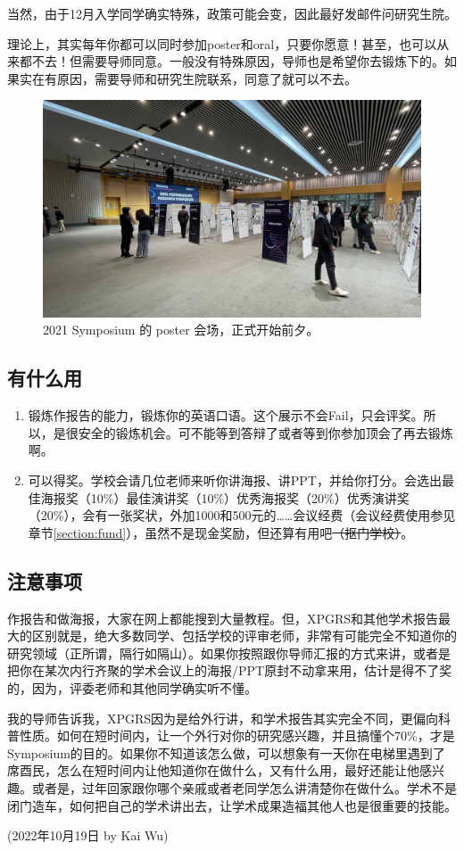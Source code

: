 当然，由于12月入学同学确实特殊，政策可能会变，因此最好发邮件问研究生院。

理论上，其实每年你都可以同时参加poster和oral，只要你愿意！甚至，也可以从来都不去！但需要导师同意。一般没有特殊原因，导师也是希望你去锻炼下的。如果实在有原因，需要导师和研究生院联系，同意了就可以不去。

\begin{figure}[H]
    \caption{2021 Symposium 的 poster 会场，正式开始前夕。}
    \centering
    \includegraphics[width=\columnwidth]{author-folder/Kai.Wu/synposium_poster.jpg}
\end{figure}

\subsection{有什么用}

\begin{enumerate}
    \item 锻炼作报告的能力，锻炼你的英语口语。这个展示不会Fail，只会评奖。所以，是很安全的锻炼机会。可不能等到答辩了或者等到你参加顶会了再去锻炼啊。
    \item 可以得奖。学校会请几位老师来听你讲海报、讲PPT，并给你打分。会选出最佳海报奖（10\%）最佳演讲奖（10\%）优秀海报奖（20\%）优秀演讲奖（20\%），会有一张奖状，外加1000和500元的……会议经费（会议经费使用参见章节\ref{section:fund}），虽然不是现金奖励，但还算有用吧\sout{（抠门学校）}。
\end{enumerate}

\subsection{注意事项}

作报告和做海报，大家在网上都能搜到大量教程。但，XPGRS和其他学术报告最大的区别就是，绝大多数同学、包括学校的评审老师，非常有可能完全不知道你的研究领域（正所谓，隔行如隔山）。如果你按照跟你导师汇报的方式来讲，或者是把你在某次内行齐聚的学术会议上的海报/PPT原封不动拿来用，估计是得不了奖的，因为，评委老师和其他同学确实听不懂。

我的导师告诉我，XPGRS因为是给外行讲，和学术报告其实完全不同，更偏向科普性质。如何在短时间内，让一个外行对你的研究感兴趣，并且搞懂个70\%，才是Symposium的目的。如果你不知道该怎么做，可以想象有一天你在电梯里遇到了席酉民，怎么在短时间内让他知道你在做什么，又有什么用，最好还能让他感兴趣。或者是，过年回家跟你哪个亲戚或者老同学怎么讲清楚你在做什么。学术不是闭门造车，如何把自己的学术讲出去，让学术成果造福其他人也是很重要的技能。

\begin{flushright}
(2022年10月19日 by Kai Wu)
\end{flushright}